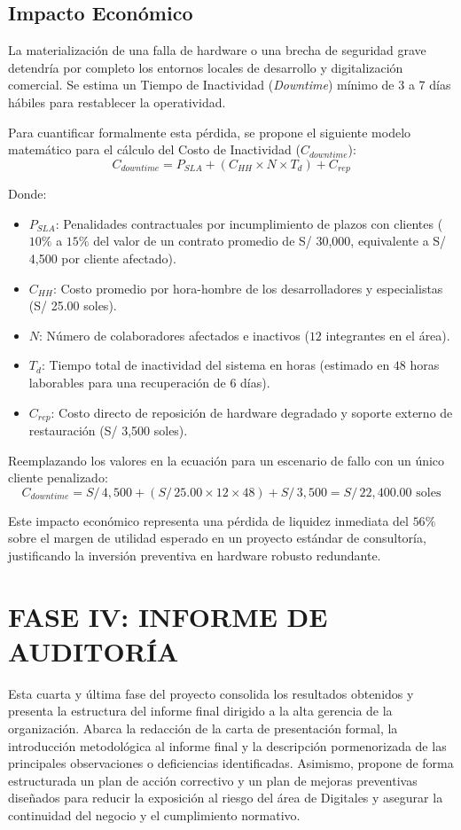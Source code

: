 \documentclass[12pt]{article}
\begin{document}
\subsection{Impacto Económico}
La materialización de una falla de hardware o una brecha de seguridad grave detendría por completo los entornos locales de desarrollo y digitalización comercial. Se estima un Tiempo de Inactividad (\textit{Downtime}) mínimo de 3 a 7 días hábiles para restablecer la operatividad.

Para cuantificar formalmente esta pérdida, se propone el siguiente modelo matemático para el cálculo del Costo de Inactividad ($C_{downtime}$):
$$C_{downtime} = P_{SLA} + (C_{HH} \times N \times T_{d}) + C_{rep}$$

Donde:
\begin{itemize}
    \item $P_{SLA}$: Penalidades contractuales por incumplimiento de plazos con clientes ($10\%$ a $15\%$ del valor de un contrato promedio de S/ 30,000, equivalente a S/ 4,500 por cliente afectado).
    \item $C_{HH}$: Costo promedio por hora-hombre de los desarrolladores y especialistas (S/ 25.00 soles).
    \item $N$: Número de colaboradores afectados e inactivos ($12$ integrantes en el área).
    \item $T_{d}$: Tiempo total de inactividad del sistema en horas (estimado en $48$ horas laborables para una recuperación de 6 días).
    \item $C_{rep}$: Costo directo de reposición de hardware degradado y soporte externo de restauración (S/ 3,500 soles).
\end{itemize}

Reemplazando los valores en la ecuación para un escenario de fallo con un único cliente penalizado:
$$C_{downtime} = S/\,4,500 + (S/\,25.00 \times 12 \times 48) + S/\,3,500 = S/\,22,400.00 \mbox{ soles}$$

Este impacto económico representa una pérdida de liquidez inmediata del $56\%$ sobre el margen de utilidad esperado en un proyecto estándar de consultoría, justificando la inversión preventiva en hardware robusto redundante.

\section{FASE IV: INFORME DE AUDITORÍA}

Esta cuarta y última fase del proyecto consolida los resultados obtenidos y presenta la estructura del informe final dirigido a la alta gerencia de la organización. Abarca la redacción de la carta de presentación formal, la introducción metodológica al informe final y la descripción pormenorizada de las principales observaciones o deficiencias identificadas. Asimismo, propone de forma estructurada un plan de acción correctivo y un plan de mejoras preventivas diseñados para reducir la exposición al riesgo del área de Digitales y asegurar la continuidad del negocio y el cumplimiento normativo.
\end{document}
